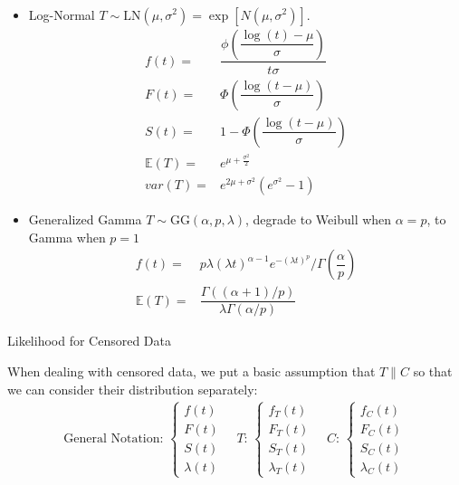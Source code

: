 \begin{itemize}[topsep=2pt,itemsep=0pt]
\begin{align}
    \end{align}
    \item Log-Normal $T\sim \mathrm{LN}(\mu ,\sigma ^2)=\exp\left[ N(\mu ,\sigma ^2) \right]$.
    \begin{align}
        f(t)=&\dfrac{\phi(\dfrac{\log(t)-\mu }{\sigma })}{t\sigma }\\
        F(t)=&\Phi\left(\dfrac{\log(t-\mu )}{\sigma }\right)\\
        S(t)=&1-\Phi\left(\dfrac{\log(t-\mu )}{\sigma }\right)\\
        \mathbb{E}(T)=&e^{\mu +\frac{\sigma ^2}{2}}\\
        var(T)=&e^{2\mu +\sigma ^2}(e^{\sigma ^2}-1)
    \end{align}
    \item Generalized Gamma $T\sim \mathrm{GG}(\alpha ,p,\lambda )$, degrade to Weibull when $ \alpha =p $, to Gamma when $ p=1 $
    \begin{align}
        f(t)=&p\lambda (\lambda t)^{\alpha -1}e^{-(\lambda t)^p}\Big/ \Gamma (\dfrac{\alpha }{p})\\
        \mathbb{E}(T)=&\dfrac{\Gamma ((\alpha +1)/p)}{\lambda \Gamma (\alpha /p)} 
    \end{align}
\end{itemize}


\begin{point}
    Likelihood for Censored Data
\end{point}

When dealing with censored data, we put a basic assumption that $ T\parallel C $ so that we can consider their distribution separately:
\begin{align}
    \text{General Notation: }\begin{cases}
        f(t)\\
        F(t)\\
        S(t)\\
        \lambda (t)
    \end{cases}\quad
    T:\,\begin{cases}
        f_T(t)\\
        F_T(t)\\
        S_T(t)\\
        \lambda_T(t)
    \end{cases}
    \quad C:\,\begin{cases}
        f_C(t)\\
        F_C(t)\\
        S_C(t)\\
        \lambda _C (t)
    \end{cases}
\end{align}

